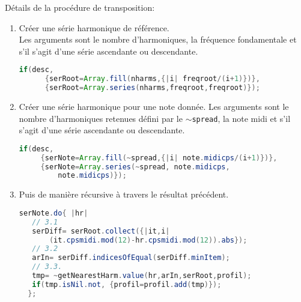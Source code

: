   \bigskip

D\'etails de la proc\'edure de transposition:
\begin{enumerate}
 \item Cr\'eer une s\'erie harmonique de r\'ef\'erence.\\ Les arguments sont le nombre d'harmoniques, la fr\'equence fondamentale et s'il s'agit d'une s\'erie ascendante ou descendante.
 \begin{lstlisting}[basicstyle=\footnotesize\ttfamily,language=Java]
 if(desc,
      {serRoot=Array.fill(nharms,{|i| freqroot/(i+1)})},
      {serRoot=Array.series(nharms,freqroot,freqroot)});
\end{lstlisting}
 \item Cr\'eer une s\'erie harmonique pour une note donn\'ee.
 Les arguments sont le nombre d'harmoniques retenues d\'efini par le \texttt{$\sim$spread}, la note midi et s'il s'agit d'une s\'erie ascendante ou descendante.
 \begin{lstlisting}[basicstyle=\footnotesize\ttfamily,language=Java]
 if(desc,
     {serNote=Array.fill(~spread,{|i| note.midicps/(i+1)})},
     {serNote=Array.series(~spread, note.midicps,
         note.midicps)});
\end{lstlisting}

 \item Puis de mani\`ere r\'ecursive \`a travers le r\'esultat pr\'ec\'edent.
 \begin{lstlisting}[basicstyle=\footnotesize\ttfamily,language=Java]
serNote.do{ |hr|
   // 3.1
   serDiff= serRoot.collect({|it,i|
       (it.cpsmidi.mod(12)-hr.cpsmidi.mod(12)).abs});
   // 3.2
   arIn= serDiff.indicesOfEqual(serDiff.minItem);
   // 3.3.
   tmp= ~getNearestHarm.value(hr,arIn,serRoot,profil);
   if(tmp.isNil.not, {profil=profil.add(tmp)});
  };
\end{lstlisting}


\end{enumerate}
